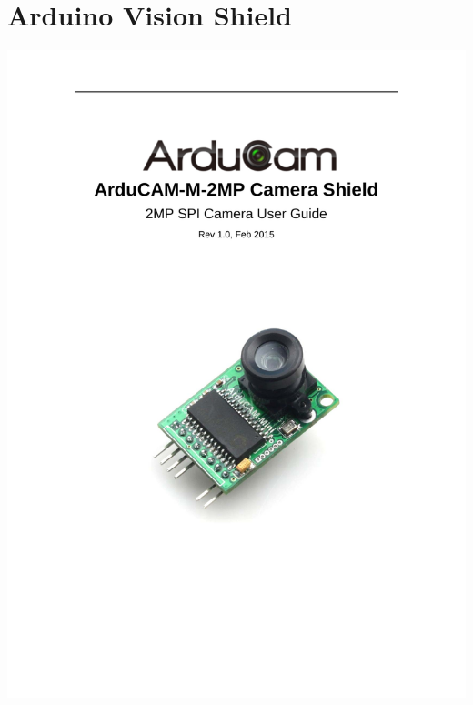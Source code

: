 %
%


\chapter{ Arduino Vision Shield}


\setcounter{VScounter}{1}

{
	\includegraphics[width=1\textwidth,page=\theVScounter]{../../MLbib/Arduino/ArduCAM/ArduCAM_Mini_2MP_Camera_Shield_DS.pdf}
	\newpage
}

\setcounter{VScounter}{1}

